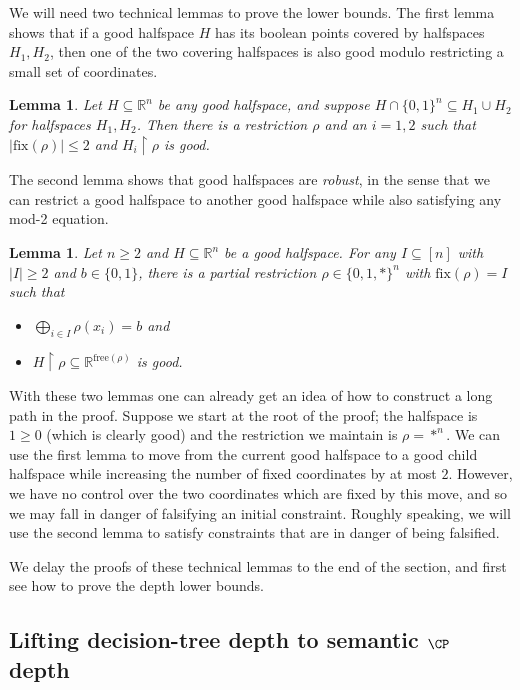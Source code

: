 \documentclass[11pt]{article}
\numberwithin{equation}{section}
\newtheorem{lemma}[theorem]{Lemma}
\theoremstyle{definition}
\theoremstyle{plain}
\newcommand{\reals}{\ensuremath{\mathbb{R}}}
\newcommand{\set}[1]{\{ #1 \}}
\renewcommand{\restriction}{\!\!\upharpoonright}
\newcommand{\free}{\ensuremath{\mathrm{free}}}
\newcommand{\fix}{\ensuremath{\mathrm{fix}}}
\newcommand{\boolcube}{\ensuremath{\{0,1\}}}
\renewcommand{\restriction}{\!\ensuremath{\upharpoonright}\!}
\begin{document}
We will need two technical lemmas to prove the lower bounds.
The first lemma shows that if a good halfspace $H$ has its boolean points covered by halfspaces $H_1, H_2$, then one of the two covering halfspaces is also good modulo restricting a small set of coordinates.
\begin{lemma}\label{lem:crux}
	Let $H \subseteq \reals^n$ be any good halfspace, and suppose $H \cap \boolcube^n \subseteq H_1 \cup H_2$ for halfspaces $H_1, H_2$.
	Then there is a restriction $\rho$ and an $i = 1,2$ such that $|\fix(\rho)| \leq 2$ and $H_i \restriction \rho$ is good.
\end{lemma}

The second lemma shows that good halfspaces are \emph{robust}, in the sense that we can restrict a good halfspace to another good halfspace while also satisfying any mod-2 equation.
\begin{lemma}\label{lem:consistent-restriction}
	Let $n \geq 2$ and $H \subseteq \reals^n$ be a good halfspace.
	For any $I \subseteq [n]$ with $|I| \geq 2$ and $b \in \{0,1\}$, there is a partial restriction $\rho \in \set{0,1,*}^n$ with $\fix(\rho) = I$ such that 
\begin{itemize}
	\item $\displaystyle{\bigoplus_{i \in I} \rho(x_i) = b}$ and
	\item $H \restriction \rho \subseteq \reals^{\free(\rho)}$ is good.
\end{itemize}
\end{lemma}

With these two lemmas one can already get an idea of how to construct a long path in the proof.
Suppose we start at the root of the proof; the halfspace is $1 \geq 0$ (which is clearly good) and the restriction we maintain is $\rho = *^n$.
We can use the first lemma to move from the current good halfspace to a good child halfspace while increasing the number of fixed coordinates by at most $2$.
However, we have no control over the two coordinates which are fixed by this move, and so we may fall in danger of falsifying an initial constraint.
Roughly speaking, we will use the second lemma to satisfy constraints that are in danger of being falsified.

We delay the proofs of these technical lemmas to the end of the section, and first see how to prove the depth lower bounds.


%
\subsection{Lifting decision-tree depth to semantic    %
  \texorpdfstring{$\CP$}{CP} depth} 
\end{document}
